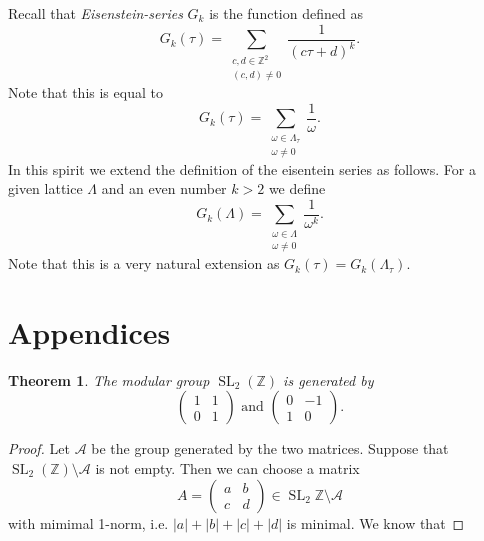 \documentclass[a4paper]{article}
\theoremstyle{theoremdd}
\newtheorem{theorem}{Theorem}[section]
\theoremstyle{definitiondd}
\theoremstyle{remarkdd}
\newcommand{\Z}{\mathbb{Z}}
\DeclareMathOperator{\SL}{SL}
\begin{document}
Recall that \emph{Eisenstein-series} $G_k$ is the function defined as \[
	G_k(\tau) = \sum_{\substack{c, d \in \Z^2 \\ (c, d) \ne 0}} \frac{1}{(c\tau + d)^{k}}
.\] 
Note that this is equal to \[
	G_k(\tau) = \sum_{\substack{\omega \in \Lambda_\tau \\ \omega \ne 0}} \frac{1}{\omega}
.\] 
In this spirit we extend the definition of the eisentein series as follows. For a given lattice $\Lambda$ and an even number  $k > 2$ we define \[
	G_k(\Lambda) = \sum_{\substack{\omega \in \Lambda \\ \omega \ne 0}} \frac{1}{\omega^{k}}
.\] 
Note that this is a very natural extension as $G_k(\tau) = G_k(\Lambda_\tau)$.
\section{Appendices}
\begin{theorem}
	The modular group $\SL_2(\Z)$ is generated by \[ 	
	\begin{pmatrix}  1 & 1 \\ 0 & 1 \end{pmatrix} 
	\text{ and }
	\begin{pmatrix} 0 & -1 \\ 1 & 0 \end{pmatrix} 
.\] 
\end{theorem}
\begin{proof}
	Let $\mathcal{A} $ be the group generated by the two matrices. 
	Suppose that $\SL_2(\Z) \setminus \mathcal{A} $ is not empty.
	Then we can choose a matrix \[
		A =\begin{pmatrix} a & b \\ c& d\end{pmatrix} \in \SL_2\Z \setminus \mathcal{A} 
	\] 
	with mimimal 1-norm, i.e. $|a| + |b| + |c| + |d|$ is minimal.
	We know that 
\end{proof}
\end{document}
